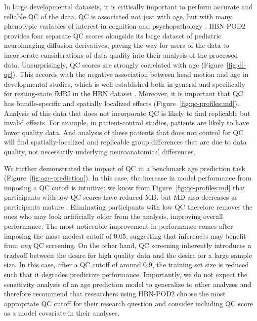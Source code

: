 \documentclass[9pt,lineno]{elife}
\begin{document}
In large developmental datasets, it is critically important to perform accurate and reliable QC of
the data.
QC is associated not just with age, but with many
phenotypic variables of interest in cognition and psychopathology \citep{siegel2017quality}.
HBN-POD2 provides four separate QC scores alongside its large dataset
of pediatric neuroimaging diffusion derivatives, paving the way for users of the
data to incorporate considerations of data quality into their analysis of the
processed data. Unsurprisingly, QC scores are strongly correlated with
age (Figure~\ref{fig:dl-qc}). This accords with the negative association
between head motion and age in developmental studies, which is well established both in general
\citep{power2012spurious,satterthwaite2012impact,fair2012distinct,yendiki2014spurious}
and specifically for resting-state fMRI in the HBN dataset \citep{alexander2017-yc}.
Moreover, it is important that QC has bundle-specific and spatially localized effects (Figure~\ref{fig:qc-profiles:md}). Analysis of this data that does not incorporate QC is likely to find replicable but invalid effects. For example, in patient-control studies, patients are likely to have lower quality data. And analysis of these patients that does not control for QC will find spatially-localized and replicable group differences that are due to data quality, not necessarily underlying neuroanatomical differences.

We further demonstrated the impact of QC in a benchmark age prediction task
(Figure~\ref{fig:age-prediction}). In this case, the increase in model performance
from imposing a QC cutoff is intuitive: we know from
Figure~\ref{fig:qc-profiles:md} that participants with low QC scores have
reduced MD, but MD also decreases as participants mature
\citep{yeatman2014lifespan,richie-halford2021multidimensional}. Eliminating
participants with low QC therefore removes the ones who may look artificially older
from the analysis, improving overall performance. The most noticeable
improvement in performance comes after imposing the most modest cutoff of
$0.05$, suggesting that inferences may benefit from \emph{any} QC screening. On
the other hand, QC screening inherently introduces a tradeoff between the desire
for high quality data and the desire for a large sample size. In this case,
after a QC cutoff of around $0.9$, the training set size is reduced such that it
degrades predictive performance. Importantly, we do not expect the sensitivity
analysis of an age prediction model to generalize to other analyses and therefore
recommend that researchers using HBN-POD2 choose the most appropriate QC cutoff for their research question and consider including QC score as a model covariate in their analyses.
\end{document}
